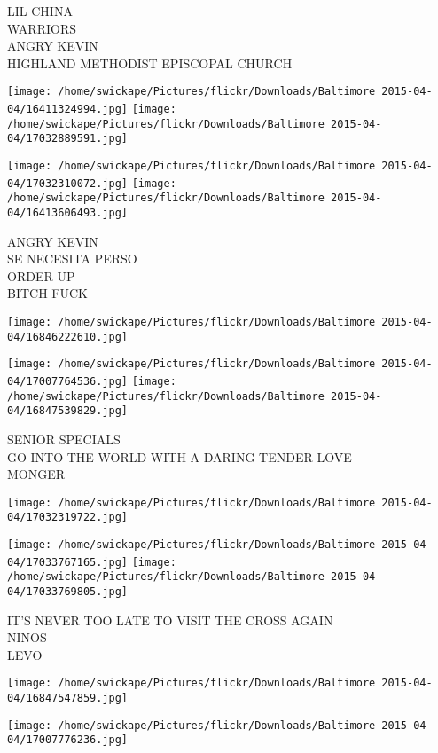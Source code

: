 \documentclass[10pt,letterpaper]{article}
\begin{document}
LIL CHINA\\
WARRIORS\\
ANGRY KEVIN\\
HIGHLAND METHODIST EPISCOPAL CHURCH
\pagebreak

\texttt{[image: /home/swickape/Pictures/flickr/Downloads/Baltimore 2015-04-04/16411324994.jpg]}
\texttt{[image: /home/swickape/Pictures/flickr/Downloads/Baltimore 2015-04-04/17032889591.jpg]}

\texttt{[image: /home/swickape/Pictures/flickr/Downloads/Baltimore 2015-04-04/17032310072.jpg]}
\texttt{[image: /home/swickape/Pictures/flickr/Downloads/Baltimore 2015-04-04/16413606493.jpg]}

ANGRY KEVIN\\
SE NECESITA PERSO\\
ORDER UP\\
BITCH FUCK
\pagebreak

\texttt{[image: /home/swickape/Pictures/flickr/Downloads/Baltimore 2015-04-04/16846222610.jpg]}

\vspace{0.25in}
\texttt{[image: /home/swickape/Pictures/flickr/Downloads/Baltimore 2015-04-04/17007764536.jpg]}
\texttt{[image: /home/swickape/Pictures/flickr/Downloads/Baltimore 2015-04-04/16847539829.jpg]}

SENIOR SPECIALS\\
GO INTO THE WORLD WITH A DARING TENDER LOVE\\
MONGER
\pagebreak

\texttt{[image: /home/swickape/Pictures/flickr/Downloads/Baltimore 2015-04-04/17032319722.jpg]}

\vspace{0.25in}
\texttt{[image: /home/swickape/Pictures/flickr/Downloads/Baltimore 2015-04-04/17033767165.jpg]}
\texttt{[image: /home/swickape/Pictures/flickr/Downloads/Baltimore 2015-04-04/17033769805.jpg]}

IT'S NEVER TOO LATE TO VISIT THE CROSS AGAIN\\
NINOS\\
LEVO
\pagebreak

\texttt{[image: /home/swickape/Pictures/flickr/Downloads/Baltimore 2015-04-04/16847547859.jpg]}

\vspace{0.25in}
\texttt{[image: /home/swickape/Pictures/flickr/Downloads/Baltimore 2015-04-04/17007776236.jpg]}
\end{document}
